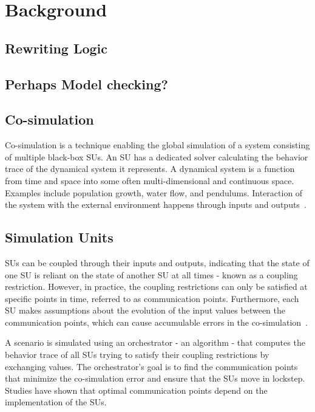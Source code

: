 \section{Background}\label{sc:background}

\subsection{Rewriting Logic}


\subsection{Perhaps Model checking?}


\subsection{Co-simulation}
Co-simulation is a technique enabling the global simulation of a system consisting of multiple black-box SUs. 
An SU has a dedicated solver calculating the behavior trace of the dynamical system it represents. 
A dynamical system is a function from time and space into some often multi-dimensional and continuous space. Examples include population growth, water flow, and pendulums. 
Interaction of the system with the external environment happens through inputs and outputs~\cite{Gomes2019a,Kubler2000}.

\subsection{Simulation Units}
SUs can be coupled through their inputs and outputs, indicating that the state of one SU is reliant on the state of another SU at all times - known as a coupling restriction. However, in practice, the coupling restrictions can only be satisfied at specific points in time, referred to as communication points. Furthermore, each SU makes assumptions about the evolution of the input values between the communication points, which can cause accumulable errors in the co-simulation~\cite{Arnold2014}. 

A scenario is simulated using an orchestrator - an algorithm - that computes the behavior trace of all SUs trying to satisfy their coupling restrictions by exchanging values. 
The orchestrator's goal is to find the communication points that minimize the co-simulation error and ensure that the SUs move in lockstep. 
Studies \cite{Gomes2019,Oakes2021,Gomes2018f,Schweizer2015c,Gomes2018a} have shown that optimal communication points depend on the implementation of the SUs.

